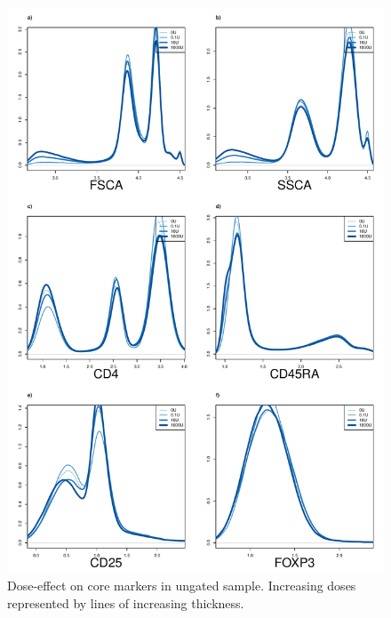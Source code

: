 \hspace{-2cm}
\begin{figure}[h]
\centering
\includegraphics[scale=.3]{IL2/figures/dose-effect.pdf}
{Dose-effect on core markers in ungated sample.}
{
Increasing doses represented by lines of increasing thickness.
}
\end{figure}

